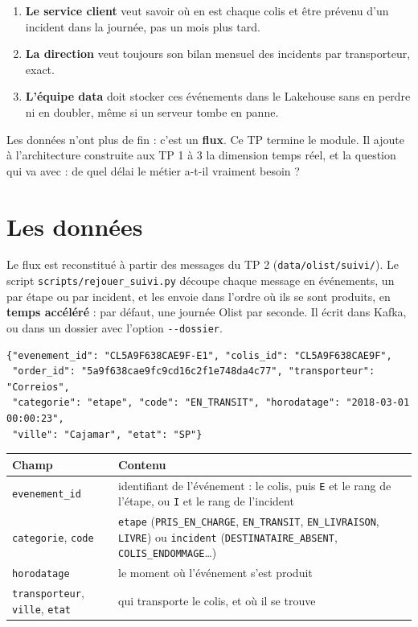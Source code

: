 \documentclass[11pt,a4paper]{article}
\newcommand{\cmd}[1]{\texttt{#1}}
\begin{document}
\begin{enumerate}[leftmargin=*,nosep]
  \item \textbf{Le service client} veut savoir où en est chaque colis et être prévenu d'un incident
        dans la journée, pas un mois plus tard.
  \item \textbf{La direction} veut toujours son bilan mensuel des incidents par transporteur, exact.
  \item \textbf{L'équipe data} doit stocker ces événements dans le Lakehouse sans en perdre ni en
        doubler, même si un serveur tombe en panne.
\end{enumerate}

Les données n'ont plus de fin : c'est un \textbf{flux}. Ce TP termine le module. Il ajoute à
l'architecture construite aux TP 1 à 3 la dimension temps réel, et la question qui va avec : de
quel délai le métier a-t-il vraiment besoin ?

\section{Les données}

Le flux est reconstitué à partir des messages du TP 2 (\cmd{data/olist/suivi/}). Le script
\cmd{scripts/rejouer\_suivi.py} découpe chaque message en événements, un par étape ou par incident,
et les envoie dans l'ordre où ils se sont produits, en \textbf{temps accéléré} : par défaut, une
journée Olist par seconde. Il écrit dans Kafka, ou dans un dossier avec l'option \cmd{-{}-dossier}.

\begin{lstlisting}
{"evenement_id": "CL5A9F638CAE9F-E1", "colis_id": "CL5A9F638CAE9F",
 "order_id": "5a9f638cae9fc9cd16c2f1e748da4c77", "transporteur": "Correios",
 "categorie": "etape", "code": "EN_TRANSIT", "horodatage": "2018-03-01 00:00:23",
 "ville": "Cajamar", "etat": "SP"}
\end{lstlisting}

\begin{center}
\small
\renewcommand{\arraystretch}{1.25}
\begin{tabularx}{\textwidth}{@{}l X@{}}
\toprule
\textbf{Champ} & \textbf{Contenu} \\
\midrule
\cmd{evenement\_id} & identifiant de l'événement : le colis, puis \cmd{E} et le rang de l'étape, ou \cmd{I} et le rang de l'incident \\
\cmd{categorie}, \cmd{code} & \cmd{etape} (\cmd{PRIS\_EN\_CHARGE}, \cmd{EN\_TRANSIT}, \cmd{EN\_LIVRAISON}, \cmd{LIVRE}) ou \cmd{incident} (\cmd{DESTINATAIRE\_ABSENT}, \cmd{COLIS\_ENDOMMAGE}\dots) \\
\cmd{horodatage} & le moment où l'événement s'est produit \\
\cmd{transporteur}, \cmd{ville}, \cmd{etat} & qui transporte le colis, et où il se trouve \\
\bottomrule
\end{tabularx}
\end{center}
\end{document}
